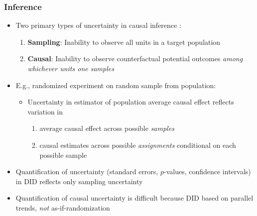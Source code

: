 \documentclass[table, xcolor = {dvipsnames}, 9pt]{beamer}
\theoremstyle{plain}
\begin{document}
\begin{frame}[t]
\frametitle{Inference}
\vfill 
\begin{itemize}
\item Two primary types of uncertainty in causal inference \citep{abadieetal2020}: \vfill
\begin{enumerate}
\item \textbf{Sampling}: Inability to observe all units in a target population \vfill
\item \textbf{Causal}: Inability to observe counterfactual potential outcomes \textit{among whichever units one samples}  \vfill
\end{enumerate}
\item E.g., randomized experiment on random sample from population: \vfill
\begin{itemize}
\item Uncertainty in estimator of population average causal effect reflects variation in \vfill
\begin{enumerate}
\item average causal effect across possible \textit{samples} \vfill
\item causal estimates across possible \textit{assignments} conditional on each possible sample \vfill
\end{enumerate} 
\end{itemize}
\item Quantification of uncertainty (standard errors, $p$-values, confidence intervals) in DID reflects only sampling uncertainty \vfill
\item Quantification of causal uncertainty is difficult because DID based on parallel trends, \textit{not} as-if-randomization \\ 
\citep{manskipepper2018} \vfill
\end{itemize}
\vfill
\end{frame}
\end{document}
